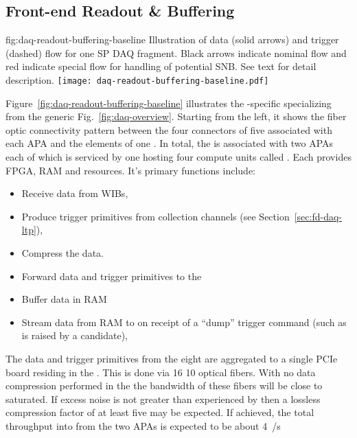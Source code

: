

\subsection{Front-end Readout \& Buffering}
\label{sec:fd-daq-ltr}


\begin{dunefigure}{fig:daq-readout-buffering-baseline}
  {Illustration of data (solid arrows) and trigger (dashed) flow for
    one SP DAQ fragment. 
    Black arrows indicate nominal flow and red indicate special flow
    for handling of potential SNB.  See text for detail description.}
  \texttt{[image: daq-readout-buffering-baseline.pdf]}%
\end{dunefigure}


Figure~\ref{fig:daq-readout-buffering-baseline} illustrates the
-specific  specializing from the generic
Fig.~\ref{fig:daq-overview}.  
Starting from the left, it shows the fiber optic connectivity pattern
between the four connectors of five   associated
with each APA and the elements of one  . 
In total, the  is associated with two APAs each of which is
serviced by one   hosting four compute units
called . 
Each  provides FPGA, RAM and  resources.
It's primary functions include:
\begin{itemize}
\item Receive data from WIBs,
\item Produce trigger primitives from collection channels (see Section~\ref{sec:fd-daq-ltp}),
\item Compress the data.
\item Forward data and trigger primitives to the 
\item Buffer data in RAM 
\item Stream data from RAM to  on receipt of a ``dump''
  trigger command (such as is raised by a  candidate),
\end{itemize}

The data and trigger primitives from the eight  are
aggregated to a single  PCIe board residing in the
. 
This is done via 16 \SI{10}{\Gbps} optical fibers. 
With no data compression performed in the  the bandwidth
of these fibers will be close to saturated. 
If excess noise is not greater than experienced by \microboone then a
lossless compression factor of at least five may be expected.
If achieved, the total throughput into  from the two APAs
is expected to be about \SI{4}{\GB/s}

